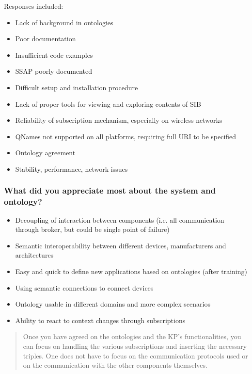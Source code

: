Responses included:

\begin{itemize}
	\item Lack of background in ontologies
	\item Poor documentation
	\item Insufficient code examples
	\item SSAP poorly documented
	\item Difficult setup and installation procedure
	\item Lack of proper tools for viewing and exploring contents of SIB
	\item Reliability of subscription mechanism, especially on wireless networks
	\item QNames not supported on all platforms, requiring full URI to be specified
	\item Ontology agreement
	\item Stability, performance, network issues
\end{itemize}




\subsubsection{What did you appreciate most about the system and ontology?}

\begin{itemize}
	\item Decoupling of interaction between components (i.e. all communication through broker, but could be single point of failure)
	\item Semantic interoperability between different devices, manufacturers and architectures
	\item Easy and quick to define new applications based on ontologies (after training)
	\item Using semantic connections to connect devices
	\item Ontology usable in different domains and more complex scenarios
	\item Ability to react to context changes through subscriptions
\end{itemize}


\begin{quote}
Once you have agreed on the ontologies and the KP's functionalities, you can focus on handling the various subscriptions and inserting the necessary triples. One does not have to focus on the communication protocols used or on the communication with the other components themselves.
\end{quote}

